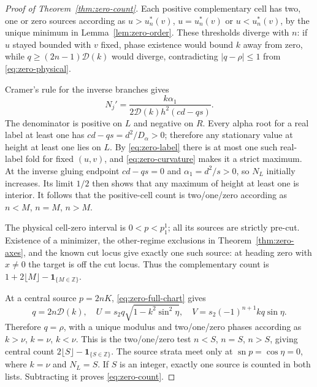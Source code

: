 \documentclass[11pt,a4paper]{article}
\theoremstyle{remark}\newtheorem{remark}[theorem]{Remark}
\newcommand{\sn}{\operatorname{sn}}
\newcommand{\ind}{\mathbf{1}}
\begin{document}
\begin{proof}[Proof of Theorem~\ref{thm:zero-count}]
Each positive complementary cell has two, one or zero sources according
as $u>u_n^*(v)$, $u=u_n^*(v)$ or $u<u_n^*(v)$, by the unique
minimum in Lemma~\ref{lem:zero-order}. These thresholds diverge with $n$:
if $u$ stayed bounded with $v$ fixed, phase existence would bound $k$
away from zero, while $q\ge(2n-1)\mathcal D(k)$ would diverge,
contradicting $|q-\rho|\le1$ from \eqref{eq:zero-physical}.

Cramer's rule for the inverse branches gives
\[
 N_j'=\frac{k\alpha_1}{2\mathcal D(k)h^2(cd-qs)}.
\]
The denominator is positive on $L$ and negative on $R$. Every alpha
root for a real label at least one has $cd-qs=d^2/D_\alpha>0$;
therefore any stationary value at height at least one lies on $L$.
By \eqref{eq:zero-label} there is at most one such real-label fold for
fixed $(u,v)$, and \eqref{eq:zero-curvature} makes it a strict maximum.
At the inverse gluing endpoint $cd-qs=0$ and
$\alpha_1=d^2/s>0$, so $N_L$ initially increases. Its limit $1/2$
then shows that any maximum of height at least one is interior.
It follows that the positive-cell count is two/one/zero according
as $n<M$, $n=M$, $n>M$.

The physical cell-zero interval is $0<p<p_1^1$; all its sources are
strictly pre-cut. Existence of a minimizer, the other-regime exclusions
in Theorem~\ref{thm:zero-axes}, and the known cut locus \cite{SS}
give exactly one such source: at heading zero with $x\ne0$ the target
is off the cut locus. Thus the complementary count is
$1+2\lfloor M\rfloor-\ind_{\{M\in\mathbb Z\}}$.

At a central source $p=2nK$, \eqref{eq:zero-full-chart} gives
\[
 q=2n\mathcal D(k),\quad
 U=s_2q\sqrt{1-k^2\sin^2\eta},\quad
 V=s_2(-1)^{n+1}kq\sin\eta .
\]
Therefore $q=\rho$, with a unique modulus and two/one/zero phases
according as $k>\nu$, $k=\nu$, $k<\nu$.
This is the two/one/zero test $n<S$, $n=S$, $n>S$, giving central
count $2\lfloor S\rfloor-\ind_{\{S\in\mathbb Z\}}$.
The source strata meet only at $\sn p=\cos\eta=0$, where $k=\nu$ and
$N_L=S$. If $S$ is an integer, exactly one source is counted in both
lists. Subtracting it proves \eqref{eq:zero-count}.
\end{proof}
\end{document}
